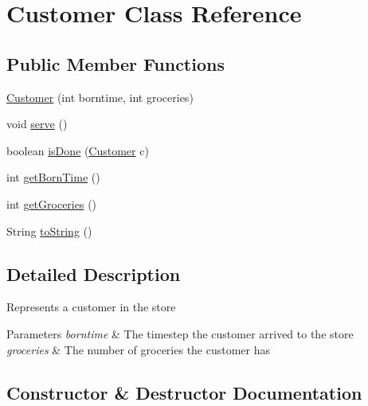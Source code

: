 \hypertarget{class_customer}{}\section{Customer Class Reference}
\label{class_customer}
\subsection*{Public Member Functions}
\begin{DoxyCompactItemize}
\item 
\hyperlink{class_customer_a8ae55c351b09b5f5839ea5caea9971e5}{Customer} (int borntime, int groceries)
\item 
void \hyperlink{class_customer_a2b6d33ea417c8496fbb46e9aa0566c7d}{serve} ()
\item 
boolean \hyperlink{class_customer_a941cb1b5e2ed9d3d6f44cad0cb1a60a3}{is\+Done} (\hyperlink{class_customer}{Customer} c)
\item 
int \hyperlink{class_customer_a5a6a7257efe6835348f14334f6857fa0}{get\+Born\+Time} ()
\item 
int \hyperlink{class_customer_a205c4ccb6d3c6ae9902e0bb48cad9f5c}{get\+Groceries} ()
\item 
String \hyperlink{class_customer_ad2d375466bd51b83c89490333ab1b859}{to\+String} ()
\end{DoxyCompactItemize}


\subsection{Detailed Description}
Represents a customer in the store 
\begin{DoxyParams}{Parameters}
{\em borntime} & The timestep the customer arrived to the store \\
\hline
{\em groceries} & The number of groceries the customer has \\
\hline
\end{DoxyParams}


\subsection{Constructor \& Destructor Documentation}
\hypertarget{class_customer_a8ae55c351b09b5f5839ea5caea9971e5}{}
